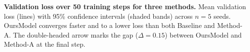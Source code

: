\caption{\textbf{Validation loss over 50 training steps for three methods.}
Mean validation loss (lines) with 95\% confidence intervals (shaded bands) across $n{=}5$ seeds.
OursModel converges faster and to a lower loss than both Baseline and Method-A.
The double-headed arrow marks the gap ($\Delta{=}0.15$) between OursModel and Method-A at the final step.}
